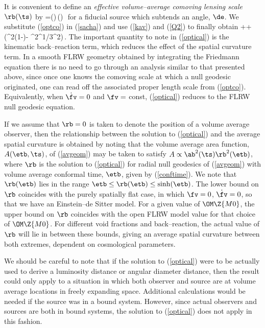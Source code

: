 \documentclass[12pt]{iopart}
\begin{document}
It is convenient to define an {\em effective volume--average comoving
lensing scale} $\rb(\ts)$ by
\beq
\ave{\dA}=\ab(\ts)\,\rb(\ts)\,\de\,
\label{optco}\eeq
for a fiducial source which subtends an angle, $\de$. We substitute
(\ref{optco}) in (\ref{sacha}) and use (\ref{kav}) and (\ref{Q2}) to finally
obtain
\beq
\ddot\rb+{\dot\ab\over\ab}\dot\rb+\Bigl({\dot\fv^2\fv(1-\fv)}-
{\al^2\fv^{1/3}\over\ab^2}\Bigr)\,.
\label{optical}\eeq
The important quantity to note in (\ref{optical}) is the kinematic
back--reaction term, which reduces the effect of the spatial curvature
term. In a smooth FLRW geometry obtained by integrating
the Friedmann equation there is no need to go through an analysis
similar to that presented above, since once one knows the comoving
scale at which a null geodesic originated, one can read off the associated
proper length scale from (\ref{optco}). Equivalently, when $\dot\fv=0$ and
$\fv=$ const, (\ref{optical}) reduces to the FLRW null geodesic equation.

If we assume that $\rb=0$ is taken to denote the position of a volume average
observer, then the relationship between the solution to (\ref{optical}) and
the average spatial curvature is obtained by noting that the volume average
area function, $A(\etb,\ts)$, of (\ref{avgeom}) may be taken to satisfy
$A\propto\ab^2(\ts)\rb^2(\etb)$, where $\rb$ is the solution to (\ref{optical})
for radial null geodesics of (\ref{avgeom}) with volume average
conformal time, $\etb$, given by (\ref{conftime}). We note that $\rb(\etb)$
lies in the range $\etb\le\rb(\etb)\le\sinh(\etb)$. The lower bound on $\rb$
coincides with the purely spatially flat case, in which $\fv=0$,
$\dot\fv=0$, so that we have an Einstein--de Sitter model. For a given
value of $\OM\Z{M0}$, the upper bound on $\rb$ coincides with the
open FLRW model value for that choice of $\OM\Z{M0}$. For different void
fractions and back--reaction, the actual value of $\rb$ will lie
in between these bounds, giving an average spatial curvature between
both extremes, dependent on cosmological parameters.

We should be careful to note that if the solution to (\ref{optical})
were to be actually used to derive a luminosity distance or angular
diameter distance, then the result could only apply to a situation in which
both observer and source are at volume average locations in freely expanding
space. Additional calculations would be needed if the source was in a bound
system. However, since actual observers and sources are both in bound
systems, the solution to (\ref{optical}) does not apply in this fashion.
\end{document}
